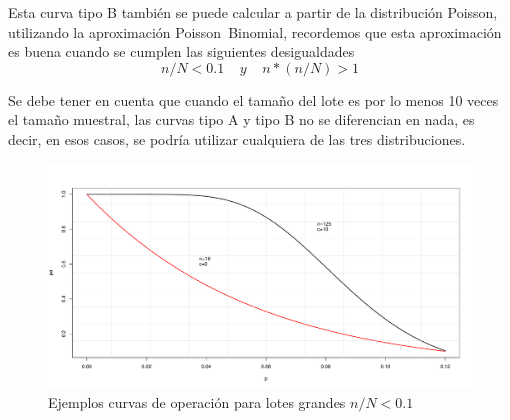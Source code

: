 \begin{itemize}
\begin{itemize}
Esta curva tipo B tambi\'{e}n se puede calcular a partir de la distribuci\'{o}n Poisson, utilizando la aproximaci\'{o}n Poisson~Binomial, recordemos que esta aproximaci\'{o}n es buena cuando se cumplen las siguientes desigualdades
$$ n/N<0.1 \;\;\;\; y \;\;\;\; n*(n/N)>1 $$
\end{itemize}
Se debe tener en cuenta que cuando el tama\~{n}o del lote es por lo menos 10 veces el tama\~{n}o muestral, las curvas tipo A y tipo B no se diferencian en nada, es decir, en esos casos, se podr\'{i}a utilizar cualquiera de las tres distribuciones.

\begin{figure}[h!]
  \centering
  \includegraphics[scale=0.45]{IMAGENES/Figura2.pdf}
  \caption{Ejemplos curvas de operaci\'{o}n para lotes grandes $n/N<0.1$}
\end{figure}


\end{itemize}
